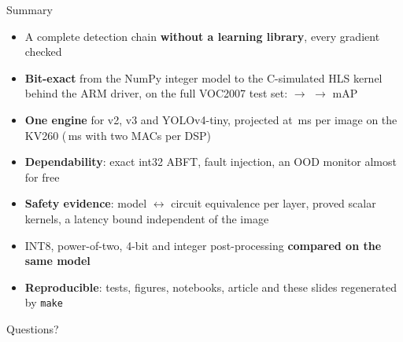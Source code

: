 \documentclass[aspectratio=169,11pt]{beamer}
\begin{document}
\begin{frame}{Summary}
  \small
  \begin{itemize}
    \item A complete detection chain \textbf{without a learning library}, every gradient checked
    \item \textbf{Bit-exact} from the NumPy integer model to the C-simulated HLS kernel behind
      the ARM driver, on the full VOC2007 test set:
       $\to$  $\to$  mAP
    \item \textbf{One engine} for v2, v3 and YOLOv4-tiny, projected at
      \,ms per image on the KV260
      (\,ms with two MACs per DSP)
    \item \textbf{Dependability}: exact int32 ABFT, fault injection, an OOD monitor almost
      for free
    \item \textbf{Safety evidence}: model $\leftrightarrow$ circuit equivalence per layer,
      proved scalar kernels, a latency bound independent of the image
    \item INT8, power-of-two, 4-bit and integer post-processing \textbf{compared on the same
      model}
    \item \textbf{Reproducible}: tests, figures, notebooks, article and these slides
      regenerated by \texttt{make}
  \end{itemize}
\end{frame}

\begin{frame}[standout]
  Questions?
\end{frame}
\end{document}
